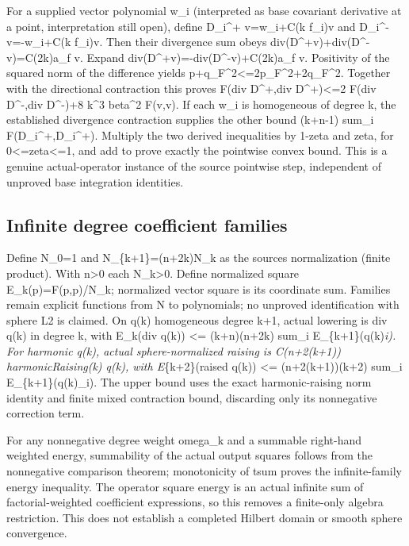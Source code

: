 \documentclass[11pt]{article}
\theoremstyle{definition}
\theoremstyle{remark}
\numberwithin{equation}{section}
\begin{document}
For a supplied vector polynomial w\_i (interpreted as base covariant
derivative at a point, interpretation still open), define D\_i\^{}+
v=w\_i+C(k f\_i)v and D\_i\^{}-v=-w\_i+C(k f\_i)v. Then their divergence
sum obeys div(D\^{}+v)+div(D\^{}-v)=C(2k)a\_f v. Expand
div(D\^{}+v)=-div(D\^{}-v)+C(2k)a\_f v. Positivity of the squared norm
of the difference yields
\textbar\textbar p+q\textbar\textbar\_F\^{}2\textless=2\textbar\textbar p\textbar\textbar\_F\^{}2+2\textbar\textbar q\textbar\textbar\_F\^{}2.
Together with the directional contraction this proves F(div D\^{}+,div
D\^{}+)\textless=2 F(div D\^{}-,div D\^{}-)+8 k\^{}3 beta\^{}2 F(v,v).
If each w\_i is homogeneous of degree k, the established divergence
contraction supplies the other bound (k+n-1) sum\_i
F(D\_i\^{}+,D\_i\^{}+). Multiply the two derived inequalities by 1-zeta
and zeta, for 0\textless=zeta\textless=1, and add to prove exactly the
pointwise convex bound. This is a genuine actual-operator instance of
the source pointwise step, independent of unproved base integration
identities.

\hypertarget{source-e4785d68ade7-infinite-degree-coefficient-families}{%
\subsection{Infinite degree coefficient
families}\label{source-e4785d68ade7-infinite-degree-coefficient-families}}

Define N\_0=1 and N\_\{k+1\}=(n+2k)N\_k as the source\textquotesingle s
normalization (finite product). With n\textgreater0 each
N\_k\textgreater0. Define normalized square E\_k(p)=F(p,p)/N\_k;
normalized vector square is its coordinate sum. Families remain explicit
functions from N to polynomials; no unproved identification with sphere
L2 is claimed. On q(k) homogeneous degree k+1, actual lowering is div
q(k) in degree k, with E\_k(div q(k)) \textless= (k+n)(n+2k) sum\_i
E\_\{k+1\}(q(k)\emph{i). For harmonic q(k), actual sphere-normalized
raising is C(n+2(k+1)) harmonicRaising(k) q(k), with E}\{k+2\}(raised
q(k)) \textless= (n+2(k+1))(k+2) sum\_i E\_\{k+1\}(q(k)\_i). The upper
bound uses the exact harmonic-raising norm identity and finite mixed
contraction bound, discarding only its nonnegative correction term.

For any nonnegative degree weight omega\_k and a summable right-hand
weighted energy, summability of the actual output squares follows from
the nonnegative comparison theorem; monotonicity of tsum proves the
infinite-family energy inequality. The operator square energy is an
actual infinite sum of factorial-weighted coefficient expressions, so
this removes a finite-only algebra restriction. This does not establish
a completed Hilbert domain or smooth sphere convergence.
\end{document}
